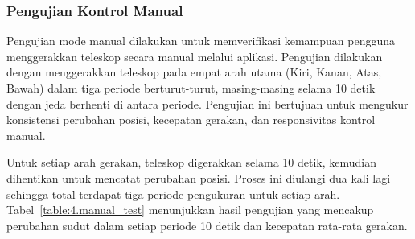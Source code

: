

\subsubsection{Pengujian Kontrol Manual} \label{IV.UjiManual}
Pengujian mode manual dilakukan untuk memverifikasi kemampuan pengguna menggerakkan teleskop secara manual melalui aplikasi. Pengujian dilakukan dengan menggerakkan teleskop pada empat arah utama (Kiri, Kanan, Atas, Bawah) dalam tiga periode berturut-turut, masing-masing selama 10 detik dengan jeda berhenti di antara periode. Pengujian ini bertujuan untuk mengukur konsistensi perubahan posisi, kecepatan gerakan, dan responsivitas kontrol manual. \par

Untuk setiap arah gerakan, teleskop digerakkan selama 10 detik, kemudian dihentikan untuk mencatat perubahan posisi. Proses ini diulangi dua kali lagi sehingga total terdapat tiga periode pengukuran untuk setiap arah. Tabel~\ref{table:4.manual_test} menunjukkan hasil pengujian yang mencakup perubahan sudut dalam setiap periode 10 detik dan kecepatan rata-rata gerakan. \par

